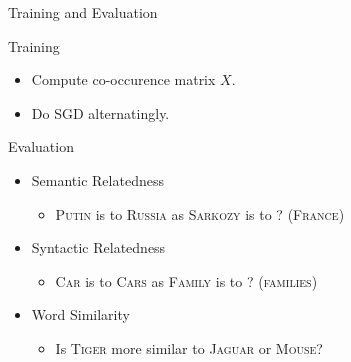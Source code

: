 \begin{frame}{Training and Evaluation}

  \begin{exampleblock}{Training}
    \begin{itemize}[<+->]
    \item Compute co-occurence matrix $X$.
    \item Do SGD alternatingly.
    \end{itemize}
  \end{exampleblock}
  
  \begin{alertblock}{Evaluation}
    \begin{itemize}[<+->]
    \item Semantic Relatedness %
      \begin{itemize}
      \item \textsc{Putin} is to \textsc{Russia} as \textsc{Sarkozy} is to ? (\textsc{France})
      \end{itemize}
    \item Syntactic Relatedness %
      \begin{itemize}
      \item \textsc{Car} is to \textsc{Cars} as \textsc{Family} is to ? (\textsc{families})
      \end{itemize}
    \item Word Similarity
      \begin{itemize}
      \item Is \textsc{Tiger} more similar to \textsc{Jaguar} or \textsc{Mouse}?
        \end{itemize}
    \end{itemize}
  \end{alertblock}
\end{frame}

